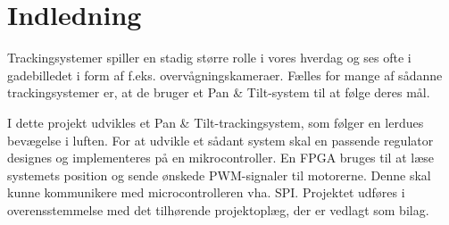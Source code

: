 \section*{Indledning}
Trackingsystemer spiller en stadig større rolle i vores hverdag og ses ofte i gadebilledet i form 
af f.eks. overvågningskameraer.
Fælles for mange af sådanne trackingsystemer er, at de bruger et Pan \& Tilt-system til at følge deres mål. 

I dette projekt udvikles et Pan \& Tilt-trackingsystem, som følger en lerdues bevægelse i 
luften. For at udvikle et sådant system skal en passende regulator designes og implementeres
på en mikrocontroller. 
En FPGA  bruges til at læse systemets position og sende ønskede PWM-signaler til motorerne. 
Denne skal kunne kommunikere med microcontrolleren vha. SPI.
Projektet udføres i overensstemmelse med det tilhørende projektoplæg, der er vedlagt 
som bilag.
